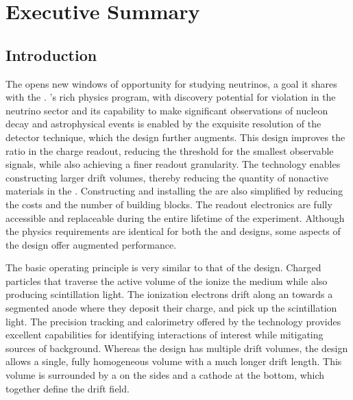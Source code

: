 \chapter{Executive Summary}
\label{ch:dp-execsum}



\section{Introduction}
\label{sec:dp-execsum-introduction}


The    opens new windows of opportunity for studying neutrinos, a goal it shares with the  .   's rich physics program, with discovery potential for  violation in the neutrino sector and its capability to make significant observations of nucleon decay and astrophysical events is enabled by the exquisite resolution of the  detector technique, which the  design further augments. This design improves the  ratio in the charge readout, reducing the threshold for the smallest observable signals, while also achieving a finer readout granularity.  The  technology enables constructing larger drift volumes, thereby reducing  the quantity of nonactive materials in the . Constructing and installing the  are also simplified by reducing the costs and the number of  building blocks. The readout electronics are fully accessible and replaceable during the entire lifetime of the experiment. Although the physics requirements are identical for both the  and  designs, some aspects of the  design offer augmented performance. 


The basic operating principle is very similar to that of the  design.  Charged particles that traverse the active volume of the  ionize the medium while also producing scintillation light. The ionization electrons drift along an \efield towards a segmented anode where they deposit their charge, and  pick up the scintillation light. The precision tracking and calorimetry offered by the  technology provides excellent capabilities for identifying interactions of interest while mitigating sources of background.  Whereas the  design has multiple drift volumes, the  design allows a single, fully homogeneous  volume with a much longer drift length. This volume is surrounded by a  on the sides and a cathode at the bottom, which together define the drift field. 

